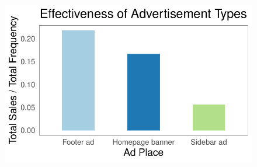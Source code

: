 \documentclass[
  letterpaper,
  DIV=11,
  numbers=noendperiod]{scrartcl}
\begin{document}
\begin{figure}[H]

{\centering \includegraphics{Report_files/figure-pdf/unnamed-chunk-29-1.pdf}

}

\end{figure}
\end{document}

